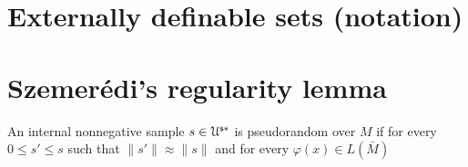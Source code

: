 \documentclass[10pt]{article}
\def\U{\EuScript U}
\def\phi{\varphi}
\theoremstyle{mio}
\theoremstyle{liscio}
\begin{document}
\section{Externally definable sets (notation)}\label{x-set}


\section{Szemer\'edi's regularity lemma}
\def\medrel#1{\parbox[t]{6ex}{\hfil$#1$}}
\def\ceq#1#2#3{\parbox[t]{29ex}{$\displaystyle #1$}\medrel{#2}$\displaystyle  #3$}

An internal nonnegative sample $s\in\U^{\sf s*}$ is pseudorandom over $M$ if for every $0\le s'\le s$ such that $\|s'\|\approx\|s\|$ and for every $\phi(x)\in L(\bar M)$
\end{document}
